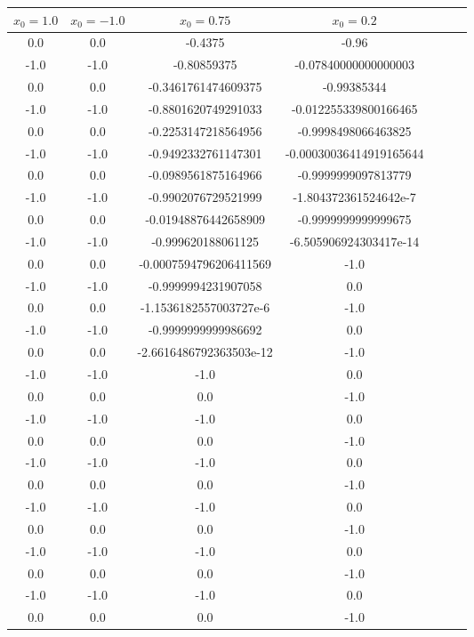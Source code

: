 \documentclass[a4paper, 12pt]{article}
\begin{document}
\begin{longtable}[H]{ccccccc}
\toprule
$x_0 = 1.0$ & $x_0 = -1.0$ & $x_0 = 0.75$ & $x_0 = 0.2$ \\ \midrule \endhead
0.0  & 0.0  & -0.4375 & -0.96 \\ \midrule
-1.0 & -1.0 & -0.80859375 & -0.07840000000000003 \\ \midrule
0.0  & 0.0  & -0.3461761474609375 & -0.99385344 \\ \midrule
-1.0 & -1.0 & -0.8801620749291033 & -0.012255339800166465 \\ \midrule
0.0  & 0.0  & -0.2253147218564956 & -0.9998498066463825 \\ \midrule
-1.0 & -1.0 & -0.9492332761147301 & -0.00030036414919165644 \\ \midrule
0.0  & 0.0  & -0.0989561875164966 & -0.9999999097813779 \\ \midrule
-1.0 & -1.0 & -0.9902076729521999 & -1.804372361524642e-7 \\ \midrule
0.0  & 0.0  & -0.01948876442658909 & -0.9999999999999675 \\ \midrule
-1.0 & -1.0 & -0.999620188061125 & -6.505906924303417e-14 \\ \midrule
0.0  & 0.0  & -0.0007594796206411569 & -1.0 \\ \midrule
-1.0 & -1.0 & -0.9999994231907058 & 0.0 \\ \midrule
0.0  & 0.0  & -1.1536182557003727e-6 & -1.0 \\ \midrule
-1.0 & -1.0 & -0.9999999999986692 & 0.0 \\ \midrule
0.0  & 0.0  & -2.6616486792363503e-12 & -1.0 \\ \midrule
-1.0 & -1.0 & -1.0 & 0.0 \\ \midrule
0.0  & 0.0  & 0.0 & -1.0 \\ \midrule
-1.0 & -1.0 & -1.0 & 0.0 \\ \midrule
0.0  & 0.0  & 0.0 & -1.0 \\ \midrule
-1.0 & -1.0 & -1.0 & 0.0 \\ \midrule
0.0  & 0.0  & 0.0 & -1.0 \\ \midrule
-1.0 & -1.0 & -1.0 & 0.0 \\ \midrule
0.0  & 0.0  & 0.0 & -1.0 \\ \midrule
-1.0 & -1.0 & -1.0 & 0.0 \\ \midrule
0.0  & 0.0  & 0.0 & -1.0 \\ \midrule
-1.0 & -1.0 & -1.0 & 0.0 \\ \midrule
0.0  & 0.0  & 0.0 & -1.0 \\ \midrule

\end{longtable}
\end{document}
